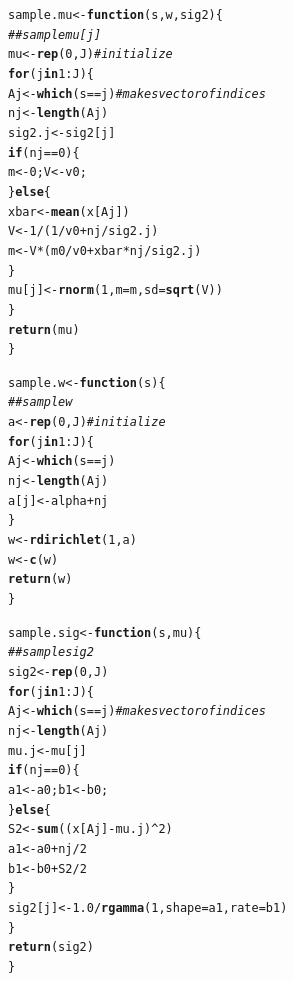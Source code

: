 \documentclass[12pt,letterpaper]{article}\usepackage[]{graphicx}\usepackage[]{color}
\makeatletter
\newcommand{\hlnum}[1]{\textcolor[rgb]{0.686,0.059,0.569}{#1}}%
\newcommand{\hlcom}[1]{\textcolor[rgb]{0.678,0.584,0.686}{\textit{#1}}}%
\newcommand{\hlopt}[1]{\textcolor[rgb]{0,0,0}{#1}}%
\newcommand{\hlstd}[1]{\textcolor[rgb]{0.345,0.345,0.345}{#1}}%
\newcommand{\hlkwa}[1]{\textcolor[rgb]{0.161,0.373,0.58}{\textbf{#1}}}%
\newcommand{\hlkwb}[1]{\textcolor[rgb]{0.69,0.353,0.396}{#1}}%
\newcommand{\hlkwc}[1]{\textcolor[rgb]{0.333,0.667,0.333}{#1}}%
\newcommand{\hlkwd}[1]{\textcolor[rgb]{0.737,0.353,0.396}{\textbf{#1}}}%
\newenvironment{kframe}{%
 \def\at@end@of@kframe{}%
 \ifinner\ifhmode%
  \def\at@end@of@kframe{\end{minipage}}%
  \begin{minipage}{\columnwidth}%
 \fi\fi%
 \def\FrameCommand##1{\hskip\@totalleftmargin \hskip-\fboxsep
 \colorbox{shadecolor}{##1}\hskip-\fboxsep
     \hskip-\linewidth \hskip-\@totalleftmargin \hskip\columnwidth}%
 \MakeFramed {\advance\hsize-\width
   \@totalleftmargin\z@ \linewidth\hsize
   \@setminipage}}%
 {\par\unskip\endMakeFramed%
 \at@end@of@kframe}
\newenvironment{knitrout}{}{} %
\makeatother
\begin{document}
\begin{knitrout}
\begin{kframe}
\begin{alltt}
\hlstd{sample.mu} \hlkwb{<-} \hlkwa{function}\hlstd{(}\hlkwc{s}\hlstd{,} \hlkwc{w}\hlstd{,} \hlkwc{sig2}\hlstd{) \{}
  \hlcom{## sample mu[j] }
  \hlstd{mu} \hlkwb{<-} \hlkwd{rep}\hlstd{(}\hlnum{0}\hlstd{, J)} \hlcom{# initialize }
  \hlkwa{for} \hlstd{(j} \hlkwa{in} \hlnum{1}\hlopt{:}\hlstd{J) \{}
    \hlstd{Aj} \hlkwb{<-} \hlkwd{which}\hlstd{(s}\hlopt{==}\hlstd{j)} \hlcom{# makes vector of indices}
    \hlstd{nj} \hlkwb{<-} \hlkwd{length}\hlstd{(Aj)}
    \hlstd{sig2.j} \hlkwb{<-} \hlstd{sig2[j]}
    \hlkwa{if} \hlstd{(nj}\hlopt{==}\hlnum{0}\hlstd{) \{}
      \hlstd{m} \hlkwb{<-} \hlnum{0}\hlstd{; V} \hlkwb{<-} \hlstd{v0;}
    \hlstd{\}} \hlkwa{else} \hlstd{\{}
      \hlstd{xbar} \hlkwb{<-} \hlkwd{mean}\hlstd{(x[Aj])}
      \hlstd{V} \hlkwb{<-} \hlnum{1}\hlopt{/}\hlstd{(}\hlnum{1}\hlopt{/}\hlstd{v0} \hlopt{+} \hlstd{nj}\hlopt{/}\hlstd{sig2.j)}
      \hlstd{m} \hlkwb{<-} \hlstd{V}\hlopt{*}\hlstd{(m0}\hlopt{/}\hlstd{v0} \hlopt{+} \hlstd{xbar}\hlopt{*}\hlstd{nj}\hlopt{/}\hlstd{sig2.j)}
    \hlstd{\}}
    \hlstd{mu[j]} \hlkwb{<-} \hlkwd{rnorm}\hlstd{(}\hlnum{1}\hlstd{,} \hlkwc{m}\hlstd{=m,} \hlkwc{sd}\hlstd{=}\hlkwd{sqrt}\hlstd{(V))}
  \hlstd{\}}
  \hlkwd{return}\hlstd{(mu)}
\hlstd{\}}

\hlstd{sample.w} \hlkwb{<-} \hlkwa{function}\hlstd{(}\hlkwc{s}\hlstd{) \{}
  \hlcom{## sample w }
  \hlstd{a} \hlkwb{<-} \hlkwd{rep}\hlstd{(}\hlnum{0}\hlstd{,J)} \hlcom{# initialize }
  \hlkwa{for}\hlstd{(j} \hlkwa{in} \hlnum{1}\hlopt{:}\hlstd{J) \{}
    \hlstd{Aj} \hlkwb{<-} \hlkwd{which}\hlstd{(s}\hlopt{==}\hlstd{j)}
    \hlstd{nj} \hlkwb{<-} \hlkwd{length}\hlstd{(Aj)}
    \hlstd{a[j]} \hlkwb{<-} \hlstd{alpha}\hlopt{+}\hlstd{nj}
  \hlstd{\}}
  \hlstd{w} \hlkwb{<-} \hlkwd{rdirichlet}\hlstd{(}\hlnum{1}\hlstd{, a)}
  \hlstd{w} \hlkwb{<-} \hlkwd{c}\hlstd{(w)}
  \hlkwd{return}\hlstd{(w)}
\hlstd{\}}

\hlstd{sample.sig} \hlkwb{<-} \hlkwa{function}\hlstd{(}\hlkwc{s}\hlstd{,} \hlkwc{mu}\hlstd{) \{}
  \hlcom{## sample sig2}
  \hlstd{sig2} \hlkwb{<-} \hlkwd{rep}\hlstd{(}\hlnum{0}\hlstd{, J)}
  \hlkwa{for} \hlstd{(j} \hlkwa{in} \hlnum{1}\hlopt{:}\hlstd{J) \{}
    \hlstd{Aj} \hlkwb{<-} \hlkwd{which}\hlstd{(s}\hlopt{==}\hlstd{j)} \hlcom{# makes vector of indices}
    \hlstd{nj} \hlkwb{<-} \hlkwd{length}\hlstd{(Aj)}
    \hlstd{mu.j} \hlkwb{<-} \hlstd{mu[j]}
    \hlkwa{if} \hlstd{(nj}\hlopt{==}\hlnum{0}\hlstd{) \{}
      \hlstd{a1} \hlkwb{<-} \hlstd{a0; b1} \hlkwb{<-} \hlstd{b0;}
    \hlstd{\}} \hlkwa{else} \hlstd{\{}
      \hlstd{S2} \hlkwb{<-} \hlkwd{sum}\hlstd{((x[Aj]}\hlopt{-}\hlstd{mu.j)}\hlopt{^}\hlnum{2}\hlstd{)}
      \hlstd{a1} \hlkwb{<-} \hlstd{a0} \hlopt{+} \hlstd{nj}\hlopt{/}\hlnum{2}
      \hlstd{b1} \hlkwb{<-} \hlstd{b0} \hlopt{+} \hlstd{S2}\hlopt{/}\hlnum{2}
    \hlstd{\}}
    \hlstd{sig2[j]} \hlkwb{<-} \hlnum{1.0}\hlopt{/}\hlkwd{rgamma}\hlstd{(}\hlnum{1}\hlstd{,} \hlkwc{shape}\hlstd{=a1,} \hlkwc{rate}\hlstd{=b1)}
  \hlstd{\}}
  \hlkwd{return}\hlstd{(sig2)}
\hlstd{\}}


\end{alltt}
\end{kframe}
\end{knitrout}
\end{document}
